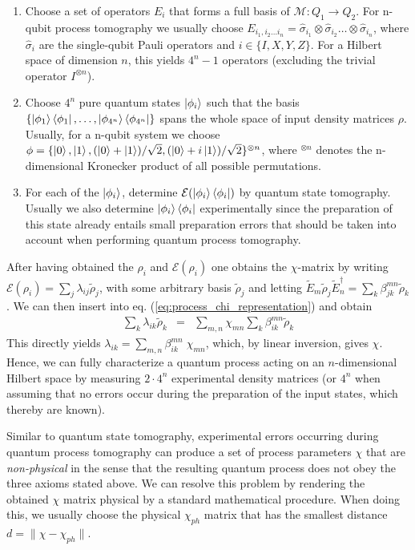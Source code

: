 \begin{enumerate}
\item Choose a set of operators $E_i$ that forms a full basis of $\mathcal{M}: Q_1 \to Q_2$. For n-qubit process tomography we usually choose $E_{i_1,i_2 \hdots i_n} = \hat{\sigma}_{i_1}\otimes \hat{\sigma}_{i_2}\hdots\otimes\hat{\sigma}_{i_n}$, where $\hat{\sigma}_i$ are the single-qubit Pauli operators and $i\in\{I,X,Y,Z\}$. For a Hilbert space of dimension $n$, this yields $4^n-1$ operators (excluding the trivial operator $I^{\otimes n}$).
\item Choose $4^n$ pure quantum states $\left| \phi_i \right>$ such that the basis $\{\left| \phi_1 \right>\left< \phi_1 \right|,\hdots,\left| \phi_{4^n} \right>\left< \phi_{4^n} \right|\}$ spans the whole space of input density matrices $\rho$. Usually, for a n-qubit system we choose $\phi = \{\left| 0 \right>,\left| 1 \right>,(\left| 0 \right>+\left| 1 \right>)/\sqrt{2},(\left| 0 \right>+i\left| 1 \right>)/\sqrt{2}\}^{\otimes n}$, where $^{\otimes n}$ denotes the n-dimensional Kronecker product of all possible permutations.
\item For each of the $\left| \phi_i \right>$, determine $\mathcal{E}(\left| \phi_i \right>\left< \phi_i \right|)$ by quantum state tomography. Usually we also determine $\left| \phi_i \right>\left< \phi_i \right|$ experimentally since the preparation of this state already entails small preparation errors that should be taken into account when performing quantum process tomography. 
\end{enumerate}

After having obtained the $\rho_i$ and $\mathcal{E}(\rho_i)$ one obtains the $\chi$-matrix by writing $\mathcal{E}(\rho_i) = \sum_j \lambda_{ij} \tilde{\rho}_j$, with some arbitrary basis $\tilde{\rho}_j$ and
letting $\tilde{E}_m \tilde{\rho}_j \tilde{E}_n^\dagger = \sum_k \beta_{jk}^{mn}\tilde{\rho}_k$. We can then insert into eq. (\ref{eq:process_chi_representation}) and obtain
\begin{eqnarray}
\sum\limits_k \lambda_{ik} \tilde{\rho}_k & = & \sum\limits_{m,n} \chi_{mn} \sum\limits_k \beta_{ik}^{mn} \tilde{\rho}_k  
\end{eqnarray}
This directly yields $\lambda_{ik} = \sum_{m,n}\beta_{ik}^{mn}\; \chi_{mn}$, which, by linear inversion,  gives $\chi$. Hence, we can fully characterize a quantum process acting on an $n$-dimensional Hilbert space by measuring $2\cdot 4^n$ experimental density matrices (or $4^n$ when assuming that no errors occur during the preparation of the input states, which thereby are known).

\smallskip

Similar to quantum state tomography, experimental errors occurring during quantum process tomography can produce a set of process parameters $\chi$ that are {\it non-physical} in the sense that the resulting quantum process does not obey the three axioms stated above. We can resolve this problem by rendering the obtained $\chi$ matrix physical by a standard mathematical procedure. When doing this, we usually choose the  physical $\chi_{ph}$ matrix that has the smallest distance $d=\|\chi-\chi_{ph}\|$.

